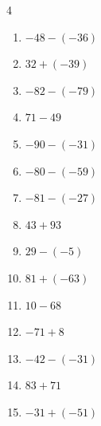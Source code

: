\begin{multicols}{4}
\begin{enumerate}
        \phantom{$=122$}

  \item $-48-(-36)$

        \phantom{$=-12$}

  \item $32+(-39)$

        \phantom{$=-7$}

  \item $-82-(-79)$

        \phantom{$=-3$}

  \item $71-49$

        \phantom{$=22$}

  \item $-90-(-31)$

        \phantom{$=-59$}

\columnbreak %

  \item $-80-(-59)$

        \phantom{$=-21$}

  \item $-81-(-27)$

        \phantom{$=-54$}

  \item $43+93$

        \phantom{$=136$}

  \item $29-(-5)$

        \phantom{$=34$}

  \item $81+(-63)$

        \phantom{$=18$}

  \item $10-68$

        \phantom{$=-58$}

  \item $-71+8$

        \phantom{$=-63$}

  \item $-42-(-31)$

        \phantom{$=-11$}

  \item $83+71$

        \phantom{$=154$}

  \item $-31+(-51)$

        \phantom{$=-82$}


\end{enumerate}
\end{multicols}
